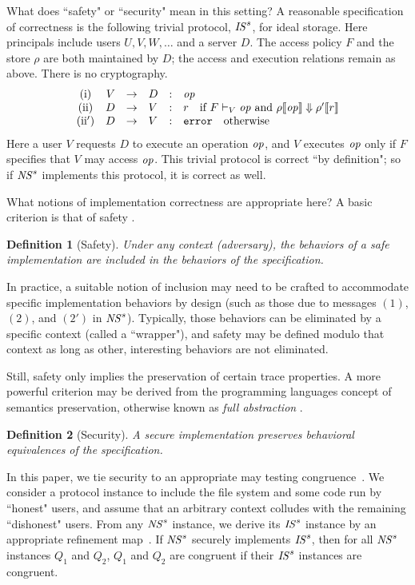 \documentclass[10pt]{article}
\newtheorem{definition}{Definition}
\newcommand{\op}{{\it op}}
\begin{document}
What does ``safety" or ``security" mean in this setting? A reasonable specification of correctness is the following trivial protocol, ${\it IS}^s$, for ideal storage. Here principals include users $U,V,W,\dots$ and a server $D$. The access policy $F$ and the store $\rho$ are both maintained by $D$; the access and execution relations remain as above. There is no cryptography. \[
\left.
\begin{array}{crclcl}
({\rm i}) &  V & \rightarrow  & D & : & \op \\
({\rm ii}) &  D & \rightarrow  & V & : & r~~\mbox{ if }F \vdash_V \op\mbox{ and }\rho\llbracket \op\rrbracket \Downarrow \rho' \llbracket r\rrbracket \\
({\rm ii'}) &  D & \rightarrow  & V & : & \mathtt{error}~~\mbox{ otherwise }
\end{array}
\right.
\]
Here a user $V$ requests $D$ to execute an operation $\op$, and $V$ executes $\op$ only if $F$ specifies that $V$ may access $\op$. This trivial protocol is correct ``by definition"; so if ${\it NS}^s$ implements this protocol, it is correct as well. 

What notions of implementation correctness are appropriate here? A basic criterion is that of safety \cite{refmap}. 
\begin{definition}[Safety]
Under any context (adversary), the behaviors of a safe implementation are included in the behaviors of the specification.
\end{definition}
\noindent
In practice, a suitable notion of inclusion may need to be crafted to accommodate specific implementation behaviors by design (such as those due to messages $(1)$, $(2)$, and $(2')$ in ${\it NS}^s$). Typically, those behaviors can be eliminated by a specific context (called a ``wrapper"), and safety may be defined modulo that context as long as other, interesting behaviors are not eliminated. 

Still, safety only implies the preservation of certain trace properties. A more powerful criterion may be derived from the programming languages concept of semantics preservation, otherwise known as \emph{full abstraction} \cite{milnerfullabs,pplt}. 
\begin{definition}[Security]
A secure implementation preserves behavioral equivalences of the specification. 
\end{definition}
\noindent
In this paper, we tie security to an appropriate may testing congruence~\cite{nicohenn84}.  We consider a protocol instance to include the file system and some code run by ``honest" users, and assume that an arbitrary context colludes with the remaining ``dishonest" users. From any ${\it NS}^s$ instance, we derive its ${\it IS}^s$ instance by an appropriate refinement map~\cite{refmap}. If ${\it NS}^s$ securely implements ${\it IS}^s$, then for all ${\it NS}^s$ instances $Q_1$ and $Q_2$,  $Q_1$ and $Q_2$ are congruent if their ${\it IS}^s$ instances are congruent. 
\end{document}
